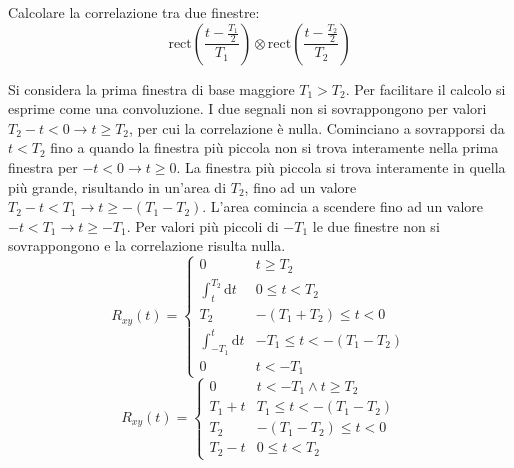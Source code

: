 \documentclass{article}
\newcommand{\rect}{\mathrm{rect}}
\newcommand{\df}{\mathrm{d}}
\begin{document}
Calcolare la correlazione tra due finestre:
\begin{equation*}
    \rect\displaystyle\left(\frac{t-\frac{T_1}{2}}{T_1}\right)\otimes\rect\left(\frac{t-\frac{T_2}{2}}{T_2}\right)
\end{equation*}

Si considera la prima finestra di base maggiore $T_1>T_2$. Per facilitare il calcolo si esprime come una convoluzione. I due segnali non si sovrappongono per valori 
$T_2-t<0\to t\geq T_2$, per cui la correlazione è nulla. Cominciano a sovrapporsi da $t<T_2$ fino a quando la finestra più piccola non si trova interamente nella prima 
finestra per $-t<0\to t\geq0$. La finestra più piccola si trova interamente in quella più grande, risultando in un'area di $T_2$, fino ad un valore 
$T_2-t<T_1\to t\geq -(T_1-T_2)$. L'area comincia a scendere fino ad un valore $-t<T_1\to t\geq -T_1$. Per valori più piccoli di $-T_1$ le due finestre non si sovrappongono e la 
correlazione risulta nulla.
\begin{equation*}
    R_{xy}(t)=\begin{cases}
        0&t\geq T_2\\
        \displaystyle\int_t^{T_2}\df t& 0\leq t<T_2\\
        T_2& -(T_1+T_2)\leq t<0\\
        \displaystyle\int_{-T_1}^t\df t& -T_1\leq t<-(T_1-T_2)\\
        0&t<-T_1
    \end{cases}
\end{equation*}
\begin{equation}
    R_{xy}(t)=\begin{cases}
        0& t<-T_1\land t\geq T_2\\
        T_1+t& T_1\leq t<-(T_1-T_2)\\
        T_2& -(T_1-T_2)\leq t<0\\
        T_2-t &  0\leq t<T_2
    \end{cases}
\end{equation}
\end{document}
